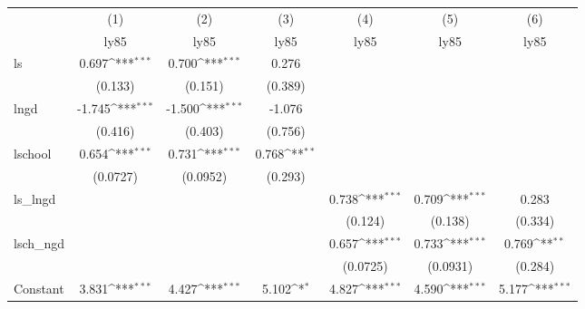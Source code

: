 {
\def\sym#1{\ifmmode^{#1}\else\(^{#1}\)\fi}
\begin{tabular}{l*{6}{c}}
\hline\hline
                    &\multicolumn{1}{c}{(1)}&\multicolumn{1}{c}{(2)}&\multicolumn{1}{c}{(3)}&\multicolumn{1}{c}{(4)}&\multicolumn{1}{c}{(5)}&\multicolumn{1}{c}{(6)}\\
                    &\multicolumn{1}{c}{ly85}&\multicolumn{1}{c}{ly85}&\multicolumn{1}{c}{ly85}&\multicolumn{1}{c}{ly85}&\multicolumn{1}{c}{ly85}&\multicolumn{1}{c}{ly85}\\
\hline
ls                  &       0.697\sym{***}&       0.700\sym{***}&       0.276         &                     &                     &                     \\
                    &     (0.133)         &     (0.151)         &     (0.389)         &                     &                     &                     \\
[1em]
lngd                &      -1.745\sym{***}&      -1.500\sym{***}&      -1.076         &                     &                     &                     \\
                    &     (0.416)         &     (0.403)         &     (0.756)         &                     &                     &                     \\
[1em]
lschool             &       0.654\sym{***}&       0.731\sym{***}&       0.768\sym{**} &                     &                     &                     \\
                    &    (0.0727)         &    (0.0952)         &     (0.293)         &                     &                     &                     \\
[1em]
ls\_lngd             &                     &                     &                     &       0.738\sym{***}&       0.709\sym{***}&       0.283         \\
                    &                     &                     &                     &     (0.124)         &     (0.138)         &     (0.334)         \\
[1em]
lsch\_ngd            &                     &                     &                     &       0.657\sym{***}&       0.733\sym{***}&       0.769\sym{**} \\
                    &                     &                     &                     &    (0.0725)         &    (0.0931)         &     (0.284)         \\
[1em]
Constant            &       3.831\sym{***}&       4.427\sym{***}&       5.102\sym{*}  &       4.827\sym{***}&       4.590\sym{***}&       5.177\sym{***}\\

\end{tabular}}
